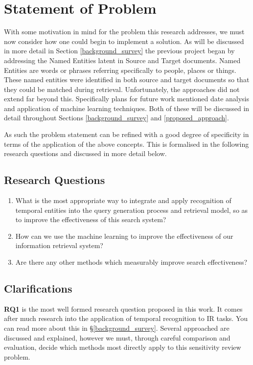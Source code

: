 \documentclass{mprop}
\begin{document}
\section{Statement of Problem}\label{problem_statement}
With some motivation in mind for the problem this research addresses, we must now consider how one could begin to implement a solution. As will be discussed in more detail in Section \ref{background_survey} the previous project began by addressing the Named Entities latent in Source and Target documents. Named Entities are words or phrases referring specifically to people, places or things. These named entities were identified in both source and target documents so that they could be matched during retrieval. Unfortunately, the approaches did not extend far beyond this. Specifically plans for future work mentioned date analysis and application of machine learning techniques. Both of these will be discussed in detail throughout Sections \ref{background_survey} and \ref{proposed_approach}.

As such the problem statement can be refined with a good degree of specificity in terms of the application of the above concepts. This is formalised in the following research questions and discussed in more detail below.
\subsection{Research Questions}
\begin{enumerate}[label=\textbf{RQ.\arabic*}]
\item What is the most appropriate way to integrate and apply recognition of temporal entities into the query generation process and retrieval model, so as to improve the effectiveness of this search system?
\item How can we use the machine learning to improve the effectiveness of our information retrieval system?
\item Are there any other methods which measurably improve search effectiveness?
\end{enumerate}

\subsection{Clarifications}
\textbf{RQ1} is the most well formed research question proposed in this work. It comes after much research into the application of temporal recognition to IR tasks. You can read more about this in \S \ref{background_survey}. Several approached are discussed and explained, however we must, through careful comparison and evaluation, decide which methods most directly apply to this sensitivity review problem.
\end{document}
